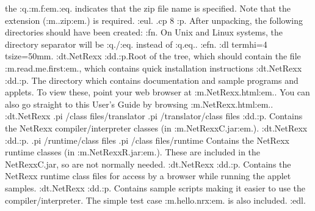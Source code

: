 the :q.:m.f:em.:eq. indicates that the zip file name is specified.  Note
that the extension (:m..zip:em.) is required.
:eul.
.cp 8
:p.
After unpacking, the following directories should have been created:
:fn.
On Unix and Linux systems, the directory separator will be :q./:eq.
instead of :q.\:eq..
:efn.
:dl termhi=4 tsize=50mm.
:dt.NetRexx
:dd.:p.Root of the tree, which should contain the
file :m.read.me.first:em., which contains quick installation
instructions
:dt.NetRexx\browse
:dd.:p.
The directory which contains documentation and sample programs and
applets.
To view these, point your web browser at :m.NetRexx\browse\netrexx.html:em..
You can also go straight to this User's Guide by
browsing :m.NetRexx\browse\nrusers.html:em..
:dt.NetRexx\lib
.pi /class files/translator
.pi /translator/class files
:dd.:p.
Contains the NetRexx compiler/interpreter classes (in :m.NetRexxC.jar:em.).
:dt.NetRexx\runlib
:dd.:p.
.pi /runtime/class files
.pi /class files/runtime
Contains the NetRexx runtime classes (in :m.NetRexxR.jar:em.).  These are
included in the NetRexxC.jar, so are not normally needed.
:dt.NetRexx\netrexx\lang
:dd.:p.
Contains the NetRexx runtime class files for access by a browser while
running the applet samples.
:dt.NetRexx\bin
:dd.:p.
Contains sample scripts making it easier to use the
compiler/interpreter.   The simple test case :m.hello.nrx:em. is also
included.
:edl.

